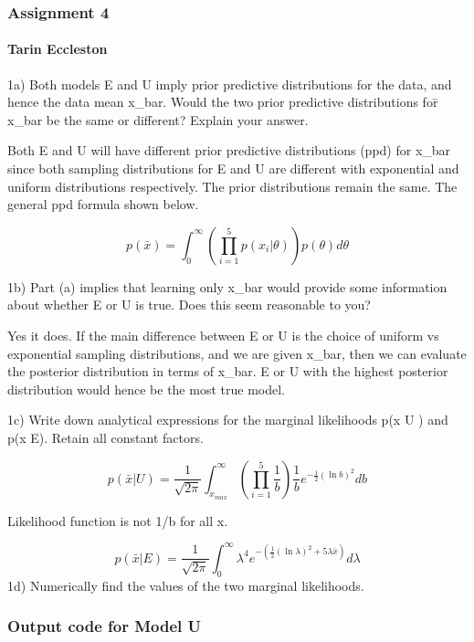 \documentclass[
]{article}
\author{}
\date{\vspace{-2.5em}}
\begin{document}
\hypertarget{assignment-4}{%
\subsubsection{Assignment 4}\label{assignment-4}}

\hypertarget{tarin-eccleston}{%
\paragraph{Tarin Eccleston}\label{tarin-eccleston}}

1a) Both models E and U imply prior predictive distributions for the
data, and hence the data mean x\_bar. Would the two prior predictive
distributions for̄ x\_bar be the same or different? Explain your answer.

Both E and U will have different prior predictive distributions (ppd)
for x\_bar since both sampling distributions for E and U are different
with exponential and uniform distributions respectively. The prior
distributions remain the same. The general ppd formula shown below.

\[
p(\bar{x}) =  \int_{0}^{\infty} (\prod_{i = 1}^{5} p(x_i| \theta)) p(\theta) d\theta
\]

1b) Part (a) implies that learning only x\_bar would provide some
information about whether E or U is true. Does this seem reasonable to
you?

Yes it does. If the main difference between E or U is the choice of
uniform vs exponential sampling distributions, and we are given x\_bar,
then we can evaluate the posterior distribution in terms of x\_bar. E or
U with the highest posterior distribution would hence be the most true
model.

1c) Write down analytical expressions for the marginal likelihoods p(x
\textbar{} U ) and p(x \textbar{} E). Retain all constant factors.

\[
p(\bar{x} | U) =  \frac{1}{\sqrt{2\pi}} \int_{x_{max}}^{\infty} (\prod_{i = 1}^{5}\frac{1}{b})\frac{1}{b} e^{-\frac{1}{2} (\ln{b})^2} db
\]

Likelihood function is not 1/b for all x.

\[
p(\bar{x} | E) =  \frac{1}{\sqrt{2\pi}} \int_{0}^{\infty} \lambda^4 e^{-(\frac{1}{2} (\ln{\lambda})^2 + 5\lambda\bar{x})} d\lambda
\] 1d) Numerically find the values of the two marginal likelihoods.

\hypertarget{output-code-for-model-u}{%
\subsubsection{Output code for Model U}\label{output-code-for-model-u}}
\end{document}
